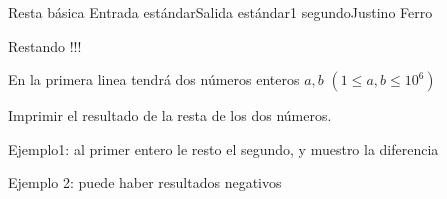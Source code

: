 \begin{problem}{Resta básica }{Entrada estándar}{Salida estándar}{1 segundo}{}{Justino Ferro}

Restando !!!
  
\InputFile

En la primera linea tendrá dos números enteros $a,b$ $(1\leq a,b \leq 10^6)$

\OutputFile
Imprimir el resultado de la resta de los dos números.

\Example

\begin{example}
\end{example}

Ejemplo1: al primer entero le resto el segundo, y muestro la diferencia

Ejemplo 2: puede haber resultados negativos
\end{problem}

